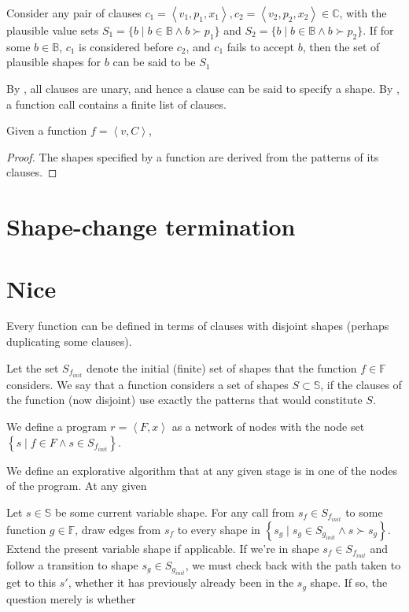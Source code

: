 \begin{corollary} Consider any pair of clauses $c_1=\left\langle v_1,p_1,x_1
\right\rangle, c_2=\left\langle v_2,p_2,x_2 \right\rangle \in\mathbb{C}$, with
the plausible value sets $S_1=\{b\mid b\in\mathbb{B} \wedge b \succ p_1\}$ and
$S_2=\{b\mid b\in\mathbb{B} \wedge b \succ p_2\}$. If for some
$b\in\mathbb{B}$, $c_1$ is considered before $c_2$, and $c_1$ fails to accept
$b$, then the set of plausible shapes for $b$ can be said to be
$S_1$\end{corollary}

By , all clauses are unary, and hence a clause
can be said to specify a shape. By , a
function call contains a finite list of clauses.

\begin{theorem} Given a function $f=\left\langle v,C\right\rangle$, \end{theorem}

\begin{proof} The shapes specified by a function are derived from the patterns
of its clauses.\end{proof}

\section{Shape-change termination}

\section{Nice}

Every function can be defined in terms of clauses with disjoint shapes (perhaps
duplicating some clauses).

Let the set $S_{f_{init}}$ denote the initial (finite) set of shapes that the
function $f\in\mathbb{F}$ considers. We say that a function considers a set of
shapes $S\subset\mathbb{S}$, if the clauses of the function (now disjoint) use
exactly the patterns that would constitute $S$.

We define a program $r= \left\langle F,x \right\rangle$ as a network of nodes
with the node set $\left\{ s \mid f\in F \wedge s\in S_{f_{init}}\right\}$.

We define an explorative algorithm that at any given stage is in one of the nodes of the program. At any given  

Let $s\in\mathbb{S}$ be some current variable shape. For any call from $s_f\in
S_{f_{init}}$ to some function $g\in\mathbb{F}$, draw edges from $s_f$ to every
shape in $\left\{ s_g\mid s_g\in S_{g_{init}} \wedge s\succ s_g \right\}$.
Extend the present variable shape if applicable. If we're in shape $s_f\in
S_{f_{init}}$ and follow a transition to shape $s_g\in S_{g_{init}}$, we must
check back with the path taken to get to this $s'$, whether it has previously
already been in the $s_g$ shape. If so, the question merely is whether 




